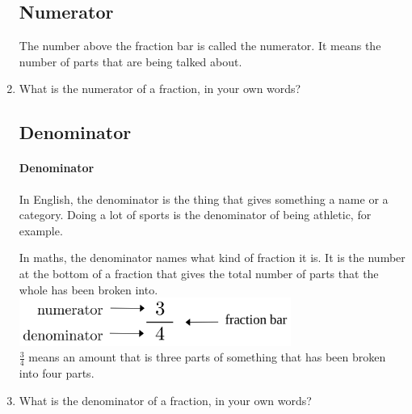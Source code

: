 \documentclass[14pt]{article}
\begin{document}
\begin{enumerate}
\newpage

\subsection*{Numerator}
The number above the fraction bar is called the numerator. It means the number of parts that are being talked about.

\item What is the numerator of a fraction, in your own words?

\begin{center}
\end{center}

\subsection*{Denominator}

\paragraph{Denominator}
In English, the denominator is  the thing that gives something a name or a category. Doing a lot of sports is the denominator of being athletic, for example.

In maths, the denominator names what kind of fraction it is. It is the number at the bottom of a fraction that gives the total number of parts that the whole has been broken into.\\

\includegraphics[width=0.7\textwidth]{fraction diagram.png}\\

$\frac{3}{4}$ means an amount that is three parts of something that has been broken into four parts.\\

\item What is the denominator of a fraction, in your own words?


\end{enumerate}
\end{document}
